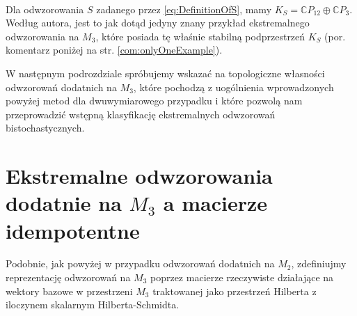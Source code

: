 {\paragraph{}

Dla odwzorowania $S$ zadanego przez \eqref{eq:DefinitionOfS}, mamy
$K_{S}= \mathbb{C} P_{12} \oplus \mathbb{C} P_{3}$.
Według autora, jest to jak dotąd jedyny znany przykład ekstremalnego
odwzorowania na $M_{3}$,
które posiada tę właśnie stabilną podprzestrzeń $K_S$
(por. komentarz poniżej na str. \ref{com:onlyOneExample}).

W następnym podrozdziale spróbujemy wskazać na topologiczne własności
odwzorowań dodatnich na $M_3$, które pochodzą z uogólnienia wprowadzonych
powyżej metod dla dwuwymiarowego przypadku
i które pozwolą nam przeprowadzić wstępną klasyfikację ekstremalnych
odwzorowań bistochastycznych.

\section{Ekstremalne odwzorowania dodatnie na $M_{3}$
a macierze idempotentne}

Podobnie, jak powyżej w przypadku odwzorowań dodatnich na $M_{2}$,
zdefiniujmy reprezentację odwzorowań na $M_{3}$ poprzez macierze
rzeczywiste działające na wektory bazowe w przestrzeni $M_{3}$
traktowanej jako przestrzeń Hilberta z iloczynem skalarnym Hilberta-Schmidta.

}
